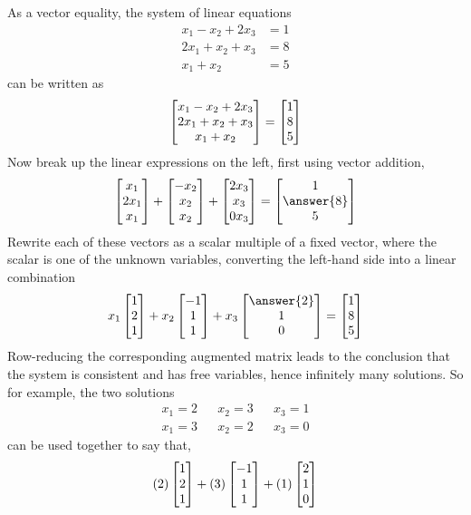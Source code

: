 \documentclass{ximera}
\begin{document}
\begin{example}
  As a vector equality, the system of linear equations
  \begin{align*}
    x_1 -x_2 +2x_3 & =1\\
    2x_1+ x_2 + x_3 & =8\\
    x_1 + x_2 & =5
  \end{align*}            
  can be written as
  \[
    \begin{bmatrix}x_1 -x_2 +2x_3\\2x_1+ x_2 + x_3\\ x_1 + x_2\end{bmatrix}
    =
    \begin{bmatrix}1\\8\\5\end{bmatrix}
  \]
  Now break up the linear expressions on the left, first using vector addition,
  \[
    \colvector{x_1\\2x_1\\x_1}+
    \colvector{-x_2\\x_2\\x_2}+
    \colvector{2x_3\\x_3\\0x_3}
    =
    \colvector{1\\\answer{8}\\5}
  \]
  Rewrite each of these vectors as a scalar multiple of a fixed
  vector, where the scalar is one of the unknown variables, converting
  the left-hand side into a linear combination
  \[
    x_1\colvector{1\\2\\1}+
    x_2\colvector{-1\\1\\1}+
    x_3\colvector{\answer{2}\\1\\0}
    =
    \colvector{1\\8\\5}
  \]
  Row-reducing the corresponding augmented matrix leads to the
  conclusion that the system is consistent and has free variables,
  hence infinitely many solutions.  So for example, the two solutions
  \begin{align*}
    x_1 = 2&&x_2 = 3&&x_3 = 1\\
    x_1 = 3&&x_2 = 2&&x_3 = 0
  \end{align*}
  can be used together to say that,
  \[
    (2)\begin{bmatrix}1\\2\\1\end{bmatrix}+
    (3)\begin{bmatrix}-1\\1\\1\end{bmatrix}+
    (1)\begin{bmatrix}2\\1\\0\end{bmatrix}
\]
\end{example}
\end{document}
